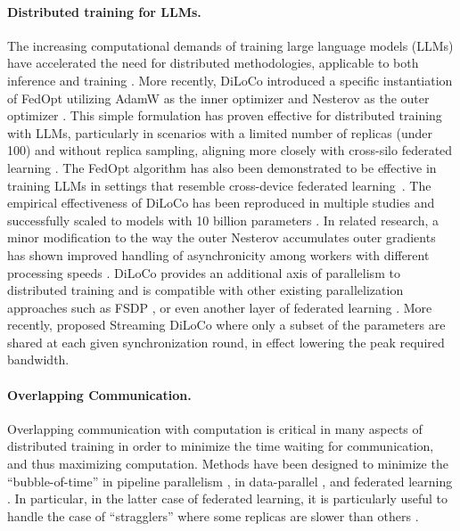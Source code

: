 \paragraph{Distributed training for LLMs.} The increasing computational demands of training large language models (LLMs) have accelerated the need for distributed methodologies, applicable to both inference \citep{borzunov2023petals} and training \citep{presser2020stub,diskin2021distributedcollab,ryabinin2021moshpit}. More recently, DiLoCo \citep{douillard2023diloco} introduced a specific instantiation of FedOpt \citep{reddi2021adaptive} utilizing AdamW \citep{loshchilov2018adamw} as the inner optimizer and Nesterov \citep{sutskever2013nesterov} as the outer optimizer \citep{huo2020outernesterov}. This simple formulation has proven effective for distributed training with LLMs, particularly in scenarios with a limited number of replicas (under 100) and without replica sampling, aligning more closely with cross-silo federated learning \citep{kairouz2021advances}. The FedOpt algorithm has also been demonstrated to be effective in training LLMs in settings that resemble cross-device federated learning~\citep{charles2024towards}. The empirical effectiveness of DiLoCo has been reproduced in multiple studies \citep{jaghouar2024opendiloco,sani2024futurelargelanguagemodel} and successfully scaled to models with 10 billion parameters \citep{jaghouar2024intellect1}.  In related research, a minor modification to the way the outer Nesterov accumulates outer gradients has shown improved handling of asynchronicity among workers with different processing speeds \citep{liu2024asyncdiloco}.  DiLoCo provides an additional axis of parallelism to distributed training \citep{shoeybi2020megatronlmtrainingmultibillionparameter} and is compatible \citep{jaghouar2024intellect1} with other existing parallelization approaches such as FSDP \citep{zhao2023fsdp}, or even another layer of federated learning \citep{sani2024photonfederatedllmpretraining}. More recently, \cite{douillard2025streamingdiloco} proposed Streaming DiLoCo where only a subset of the parameters are shared at each given synchronization round, in effect lowering the peak required bandwidth.

\paragraph{Overlapping Communication.} Overlapping communication with computation is critical in many aspects of distributed training in order to minimize the time waiting for communication, and thus maximizing computation. Methods have been designed to minimize the ``bubble-of-time'' in pipeline parallelism \citep{narayanan2021pipedream2bw,qi2023zerobubblepipelineparallelism}, in data-parallel \citep{zhao2013butterfly,lin2020deepgradientcompressionreducing}, and federated learning \citep{xie2019asynchronous,liu2024asyncdiloco}. In particular, in the latter case of federated learning, it is particularly useful to handle the case of ``stragglers'' where some replicas are slower than others \citep{koh2006parallel, recht2011hogwild, dean2012large, lian2015asynchronous, diskin2021distributedcollab}.